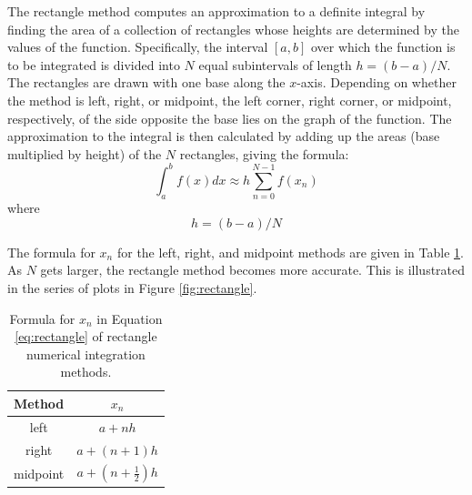 \label{Rectangle_Integration}

The rectangle method computes an approximation to a 
definite integral by finding the area of a collection of rectangles whose heights are determined 
by the values of the function.  Specifically, the interval $[a,b]$ over which the function is to 
be integrated is divided into $N$ equal subintervals of length $h = (b-a)/N$. The rectangles are 
drawn with one base along the $x$-axis. Depending on whether the method is left, right, or midpoint,
the left corner, right corner, or midpoint, respectively, of the side opposite the base lies on the 
graph of the function. The approximation to the integral is 
then calculated by adding up the areas (base multiplied by height) of the $N$ rectangles, 
giving the formula:
\begin{equation}
  \int_a^b f(x) dx \approx h \sum_{n=0}^{N-1} f(x_n) \label{eq:rectangle}
\end{equation}
where
\begin{equation}
  h=(b-a)/N  \label{eq:subinterval-width}
\end{equation}

The formula for $x_n$ for the left, right, and midpoint methods are given in Table \ref{tab:xn-rectangle}.
As $N$ gets larger, the rectangle method becomes more accurate. This is illustrated in the series of plots
in Figure \ref{fig:rectangle}.

\begin{table}[htbp]
  \centering
  \caption{Formula for $x_n$ in Equation \ref{eq:rectangle} of 
  rectangle numerical integration methods.} 
  \label{tab:xn-rectangle}
  \begin{tabular}{cc}
    \textbf{Method} & \textbf{$x_n$} \\ \toprule
    left & $a+nh$ \\ \midrule
    right & $a+(n+1)h$ \\ \midrule
    midpoint & $a+\left(n + \frac{1}{2}\right)h$ \\ \bottomrule
  \end{tabular}
\end{table}

